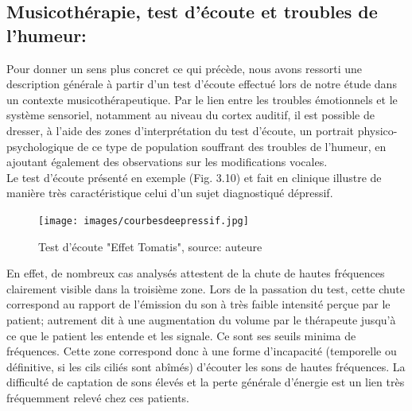 \subsection{Musicothérapie, test d'écoute et troubles de l'humeur:}
Pour donner un sens plus concret ce qui précède, nous avons ressorti une description 
générale à partir d'un test d'écoute effectué lors de notre étude dans un contexte musicothérapeutique.
Par le lien entre les troubles
émotionnels et le
système sensoriel, notamment au niveau du cortex auditif, il est 
possible de dresser, à l'aide des zones d'interprétation du test d'écoute, un portrait 
physico-psychologique de ce type de population souffrant des troubles de l'humeur, 
en ajoutant également des observations sur les modifications vocales.
	\\
Le test d'écoute présenté en exemple (Fig. 3.10) et fait en clinique illustre de 
manière très 
caractéristique celui d'un sujet diagnostiqué dépressif.
\begin{figure}[h]
	\centering
	\texttt{[image: images/courbesdeepressif.jpg]}
	\caption{Test d'écoute "Effet Tomatis", source: auteure}
	\label{fig:courbes du dépressif}
\end{figure}
En effet, de nombreux cas analysés attestent de la 
chute de hautes fréquences 
clairement visible dans la troisième zone. Lors de la passation du test, cette chute correspond au rapport 
de 
l'émission du son à
très faible intensité perçue par le
patient;  autrement dit à une augmentation
du volume
par le thérapeute jusqu'à ce que le patient les entende et les signale.
Ce sont ses seuils minima de fréquences.
Cette zone correspond donc à une forme d'incapacité (temporelle ou définitive, si les cils ciliés sont 
abîmés) d'écouter les sons de 
hautes fréquences. La
difficulté de captation de sons élevés et  la perte générale d'énergie est un lien très 
fréquemment relevé chez ces patients. %



